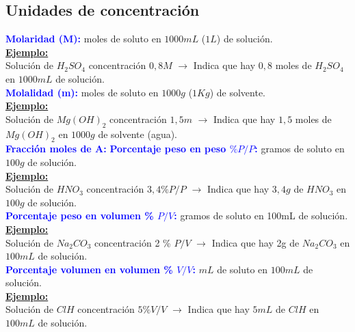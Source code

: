     \subsection{Unidades de concentración}
        \textcolor{blue}{\textbf{Molaridad (M):}} moles de soluto en $1000mL$ ($1L$) de solución.\\
        \textbf{\underline{Ejemplo:}} \\ Solución de $H_2SO_4$ concentración $0,8M$ $\rightarrow$ Indica que hay $0,8$ moles de $H_2SO_4$ en $1000mL$ de solución. \\[5pt]
        \textcolor{blue}{\textbf{Molalidad (m):}} moles de soluto en $1000g$ ($1Kg$) de solvente. \\
        \textbf{\underline{Ejemplo:}} \\ Solución de $Mg(OH)_2$ concentración $1,5m$ $\rightarrow$ Indica que hay $1,5$ moles de $Mg(OH)_2$ en $1000g$ de solvente (agua). \\[5pt]
        \textcolor{blue}{\textbf{Fracción moles de A:}} 
         \vspace{5pt}
        \textcolor{blue}{\textbf{Porcentaje peso en peso $\% P/P$:}} gramos de soluto en $100g$ de solución. \\
        \textbf{\underline{Ejemplo:}} \\ Solución de $HNO_3$ concentración $3,4 \% P/P$ $\rightarrow$ Indica que hay $3,4g$ de $HNO_3$ en $100g$ de solución. \\[5pt]
        \saltoPag{}
        \textcolor{blue}{\textbf{Porcentaje peso en volumen \% $P/V$:}} gramos de soluto en 100mL de solución. \\
        \textbf{\underline{Ejemplo:}} \\ Solución de $Na_2CO_3$ concentración 2 \% $P/V$ $\rightarrow$ Indica que hay 2g de $Na_2CO_3$ en $100mL$ de solución. \\[5pt]
        \textcolor{blue}{\textbf{Porcentaje volumen en volumen \% $V/V$:}} $mL$ de soluto en $100mL$ de solución. \\
        \textbf{\underline{Ejemplo:}} \\ Solución de $ClH$ concentración $5\% V/V$ $\rightarrow$ Indica que hay $5mL$ de $ClH$ en $100mL$ de solución.
